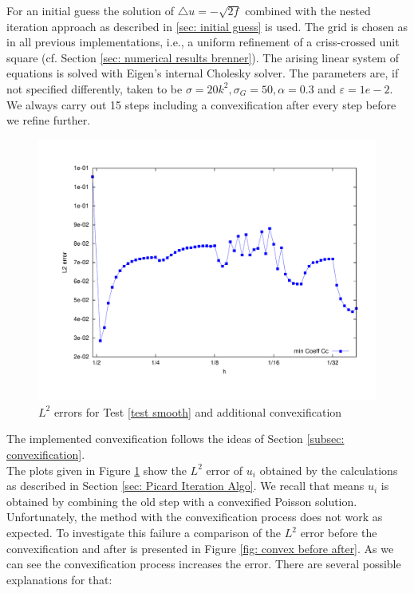 For an initial guess the solution of $\triangle u = -\sqrt{2f}$ combined with the nested iteration approach as described in \ref{sec: initial guess} is used. The grid is chosen as in all previous implementations, i.e., a uniform refinement of a criss-crossed unit square (cf. Section \ref{sec: numerical results brenner}).
The arising linear system of equations is solved with Eigen's internal Cholesky solver.
The parameters are, if not specified differently, taken to be $\sigma=20 k^2, \sigma_G = 50, \alpha =
0.3$ and $\varepsilon = 1e-2$. We always carry out 15 steps including a convexification after every step before we refine further.
\begin{figure}[H]
\centering
	\includegraphics[scale =0.4]{plots/MA1_convexify.pdf}
	\caption{$L^2$ errors for Test \ref{test smooth} and additional convexification}
	\label{fig: l2 errors test smooth ourMethodConvex}
\end{figure}
The implemented convexification follows the ideas of Section \ref{subsec: convexification}. \\
The plots given in Figure \ref{fig: l2 errors test smooth ourMethodConvex} show the $L^2$ error of $u_i$ obtained by the calculations as described in Section \ref{sec: Picard Iteration Algo}. We recall that means $u_i$ is obtained by combining the old step with a convexified Poisson solution. Unfortunately, the method with the convexification process does not work as expected.
To investigate this failure a comparison of the $L^2$ error before the convexification and after is presented in Figure \ref{fig: convex before after}. As we can see the convexification process increases the error. There are several possible explanations for that:

